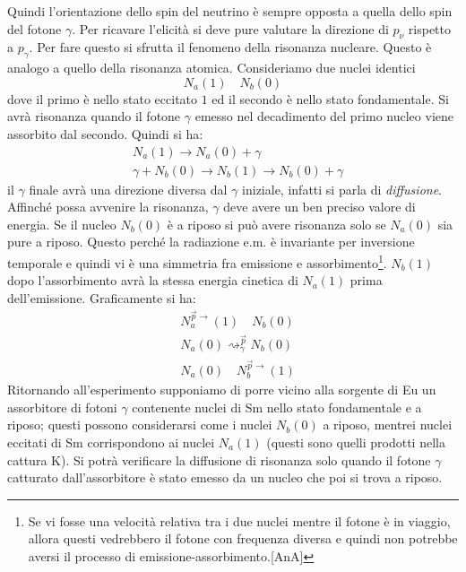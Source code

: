 Quindi l'orientazione dello spin del neutrino è sempre opposta a quella dello 
spin del fotone $\gamma$. Per ricavare l'elicità si deve pure valutare
la direzione di $p_{\nu}$ rispetto a $p_{\gamma}$. Per fare questo si sfrutta 
il fenomeno della risonanza nucleare. Questo è analogo a quello della 
risonanza atomica.
Consideriamo due nuclei identici
\[
N_a(1)\quad N_b(0)
\]
dove il primo è nello stato eccitato $1$ ed il secondo è nello stato 
fondamentale. Si avrà risonanza quando il fotone $\gamma$ emesso nel 
decadimento
del primo nucleo viene assorbito dal secondo. Quindi si ha:
\begin{align*}
&N_a(1)\rightarrow N_a(0)+\gamma\\
&\gamma+N_b(0)\rightarrow N_b(1)\rightarrow N_b(0)+\gamma
\end{align*}
il $\gamma$ finale avrà una direzione diversa dal $\gamma$ iniziale, infatti 
si parla di \textit{diffusione}. Affinché possa avvenire la risonanza,
$\gamma$ deve avere un ben preciso valore di energia. Se il nucleo $N_b(0)$ è 
a riposo si può avere risonanza solo se $N_a(0)$ sia pure a riposo.
Questo perché la radiazione e.m. è invariante per inversione temporale e 
quindi vi è una simmetria fra emissione e assorbimento\footnote{Se vi fosse 
una velocità relativa
tra i due nuclei mentre il fotone è in viaggio, allora questi vedrebbero il 
fotone con frequenza diversa e quindi non potrebbe aversi il processo di 
emissione-assorbimento.[AnA]}.
$N_b(1)$ dopo l'assorbimento avrà la stessa energia cinetica di $N_a(1)$ prima 
dell'emissione. Graficamente si ha:
\begin{align*}
&N_a^{\vec{p}\rightarrow}(1)\quad N_b(0)\\
&N_a(0)\rightsquigarrow_{\gamma}^{\vec{p}}N_b(0)\\
&N_a(0)\quad N_b^{\vec{p}\rightarrow}(1)
\end{align*}
Ritornando all'esperimento supponiamo di porre vicino alla sorgente di Eu un 
assorbitore di fotoni $\gamma$ contenente nuclei di Sm nello stato fondamentale 
e a riposo;
questi possono considerarsi come i nuclei $N_b(0)$ a riposo, mentrei nuclei 
eccitati di Sm corrispondono ai nuclei $N_a(1)$ (questi sono quelli prodotti 
nella cattura K).
Si potrà verificare la diffusione di risonanza solo quando il fotone $\gamma$ 
catturato dall'assorbitore è stato emesso da un nucleo che poi si trova a 
riposo.

